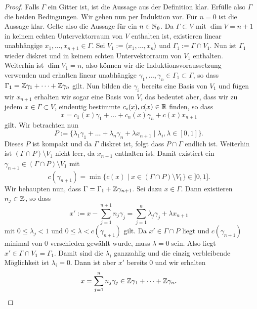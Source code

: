 \begin{proof}
  Falls $\Gamma$ ein Gitter ist, ist die Aussage aus der Definition
  klar. Erfülle also $\Gamma$ die beiden Bedingungen. Wir gehen nun
  per Induktion vor. Für $n = 0$ ist die Aussage klar. Gelte also die
  Aussage für ein $n \in \mathbb{N}_0$. Da $\Gamma \subset V$ mit $\dim V =
  n+1$ in keinem echten
  Untervektorraum von $V$ enthalten ist, existieren linear unabhängige $x_1, \dots,
  x_{n+1} \in \Gamma$. Sei $V_1 := \langle x_1, \dots, x_n \rangle$
  und $\Gamma_1 := \Gamma \cap V_1$. Nun ist $\Gamma_1$ wieder diskret
  und in keinem echten Untervektorraum von $V_1$ enthalten. Weiterhin
  ist $\dim V_1 = n$, also können wir die Induktionsvoraussetzung
  verwenden und erhalten linear unabhängige $\gamma_1, \dots, \gamma_n
  \in \Gamma_1 \subset \Gamma$, so dass $\Gamma_1 = \mathbb{Z} \gamma_1 +
  \dots + \mathbb{Z} \gamma_n$ gilt. Nun bilden die $\gamma_i$ bereits eine
  Basis von $V_1$ und fügen wir $x_{n+1}$ erhalten wir sogar eine Basis
  von $V$, das bedeutet aber, dass wir zu jedem $x \in \Gamma \subset
  V$, eindeutig bestimmte $c_i(x), c(x) \in \mathbb{R}$ finden, so dass
  \[
  x = c_1(x) \gamma_1 + \dots + c_n(x) \gamma_n + c(x) x_{n+1}
  \]
  gilt. Wir betrachten nun
  \[
  P := \{ \lambda_1 \gamma_1 + \dots + \lambda_n \gamma_n + \lambda
  x_{n+1} \mid \lambda_i, \lambda \in [0,1] \}.
  \]
  Dieses $P$ ist kompakt und da $\Gamma$ diskret ist, folgt dass $P
  \cap \Gamma$ endlich ist. Weiterhin ist $( \Gamma \cap P) \setminus
  V_1$ nicht leer, da $x_{n+1}$ enthalten ist. Damit existiert ein
  $\gamma_{n+1} \in ( \Gamma \cap P) \setminus V_1$ mit
  \[
  c(\gamma_{n+1}) = \min \{ c(x) \mid x \in ( \Gamma \cap P ) \setminus
  V_1 \} \in ]0, 1].
  \]
  Wir behaupten nun, dass $\Gamma = \Gamma_1 + \mathbb{Z} \gamma_{n+1}$. Sei
  dazu $x \in \Gamma$. Dann existieren $n_j \in \mathbb{Z}$, so dass
  \[
  x' := x - \sum_{j=1}^{n+1} n_j \gamma_j = \sum_{j=1}^n \lambda_j
  \gamma_j + \lambda x_{n+1}
  \]
  mit $0 \leq \lambda_j < 1$ und $0 \leq \lambda < c(\gamma_{n+1})$
  gilt. Da $x' \in \Gamma \cap P$ liegt und $c(\gamma_{n+1})$ minimal
  von 0 verschieden gewählt wurde, muss $\lambda = 0$ sein. Also liegt
  $x' \in \Gamma \cap V_1 = \Gamma_1$. Damit sind die $\lambda_i$
  ganzzahlig und die einzig verbleibende Möglichkeit ist $\lambda_i =
  0$. Dann ist aber $x'$ bereits 0 und wir erhalten 
  \[
  x = \sum_{j=1}^n n_j \gamma_j \in \mathbb{Z} \gamma_1 + \dots + \mathbb{Z} \gamma_n.
  \]
\end{proof}

